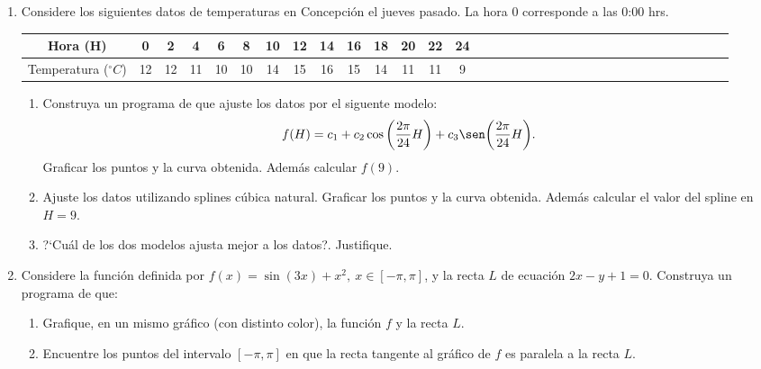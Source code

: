 \documentclass[letter,11pt]{article}
\begin{document}
\begin{enumerate}

\item 
Considere los siguientes datos de temperaturas en Concepci\'on  el jueves pasado.
 La hora $0$ corresponde a las 0:00 hrs.
 
 \begin{center}
\begin{tabular}{c|ccccccccccccccccccccccccccccccccc}
Hora (H) & 0 & 2 & 4 & 6 & 8 &10 &12 &14 &16 &18 &20 &22 &24 \\
\hline 
Temperatura ($^\circ C$)
& 12 & 12 & 11 &10 &10 &14 &15 & 16 &15 &14 &11& 11 & 9
\end{tabular}
\end{center}
  \begin{enumerate}
\item  {} Construya un programa de \octave  que ajuste los datos por el siguente modelo:
$$
\displaystyle f(H) =  c_1 + c_2 \cos\bigg(\frac{2\pi}{24} H\bigg) + c_3 \sen\bigg(\frac{2\pi}{24} H\bigg).
$$
Graficar los puntos y la curva obtenida.  Adem\'as calcular $f(9)$.

\item  {} Ajuste los datos utilizando splines c\'ubica natural. Graficar los puntos y la curva obtenida.  Adem\'as calcular el valor del spline en  $H =9$.

\item  {} ?`Cu\'al de los dos modelos ajusta mejor a los datos?. Justifique.
  \end{enumerate}
\item
Considere la funci\'on definida por $f(x) = \sin(3x) + x^2, \ x\in [-\pi,\pi]$, y la recta $L$ de ecuaci\'on $2x-y+1=0$. Construya un programa de \octave que:
\begin{enumerate}
    \item {} Grafique, en un mismo gr\'afico (con distinto color), la funci\'on $f$ y la recta $L$.
    \item {} Encuentre los puntos del intervalo $[-\pi,\pi]$ en que la recta tangente al gr\'afico de $f$ es paralela a la recta $L$.
\end{enumerate}
\end{enumerate}
\end{document}
